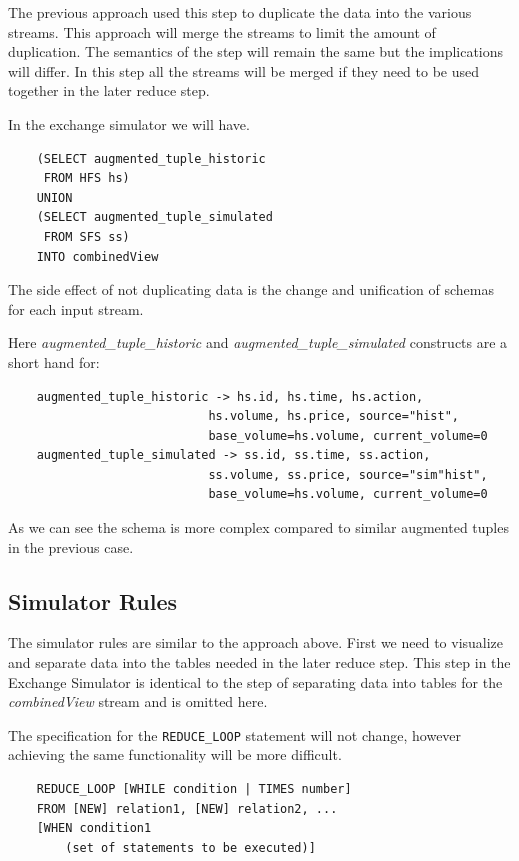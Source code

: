\documentclass{article}
\begin{document}
The previous approach used this step to duplicate the data into the various streams. This approach will merge the streams to limit the amount of duplication. The semantics of the step will remain the same but the implications will differ. In this step all the streams will be merged if they need to be used together in the later reduce step.


In the exchange simulator we will have. 
\begin{verbatim}
    (SELECT augmented_tuple_historic
     FROM HFS hs)
    UNION
    (SELECT augmented_tuple_simulated
     FROM SFS ss)
    INTO combinedView 
\end{verbatim}

The side effect of not duplicating data is the change and unification of schemas for each input stream. 

Here \emph{augmented\_tuple\_historic} and \emph{augmented\_tuple\_simulated} constructs are a short hand for:

\begin{verbatim}
    augmented_tuple_historic -> hs.id, hs.time, hs.action,
                            hs.volume, hs.price, source="hist",
                            base_volume=hs.volume, current_volume=0
    augmented_tuple_simulated -> ss.id, ss.time, ss.action,
                            ss.volume, ss.price, source="sim"hist",
                            base_volume=hs.volume, current_volume=0
\end{verbatim}

As we can see the schema is more complex compared to similar augmented tuples in the previous case.

\subsection{Simulator Rules}

The simulator rules are similar to the approach above. First we need to visualize and separate data into the tables needed in the later reduce step. This step in the Exchange Simulator is identical to the step of separating data into tables for the \emph{combinedView} stream and is omitted here.

The specification for the {\tt REDUCE\_LOOP} statement will not change, however achieving the same functionality will be more difficult. 

\begin{verbatim}
    REDUCE_LOOP [WHILE condition | TIMES number]
    FROM [NEW] relation1, [NEW] relation2, ... 
    [WHEN condition1
        (set of statements to be executed)]
\end{verbatim}
\end{document}
